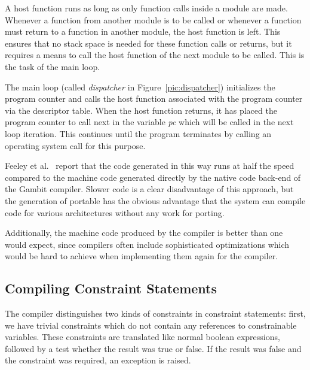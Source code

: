 A host function runs as long as only function calls inside a module
are made.  Whenever a function from another module is to be called or
whenever a function must return to a function in another module, the
host function is left.  This ensures that no stack space is needed for
these function calls or returns, but it requires a means to call the
host function of the next \turtle{} module to be called.  This is the
task of the main loop.

The main loop (called {\em dispatcher} in Figure~\ref{pic:dispatcher})
initializes the program counter and calls the host function associated
with the program counter via the descriptor table.  When the host
function returns, it has placed the program counter to call next in
the variable {\em pc} which will be called in the next loop iteration.
This continues until the program terminates by calling an operating
system call for this purpose.

Feeley et al.~\cite{feeley97compilingtoc} report that the \cee{} code
generated in this way runs at half the speed compared to the machine
code generated directly by the native code back-end of the Gambit
compiler.  Slower code is a clear disadvantage of this approach, but
the generation of portable \cee{} has the obvious advantage that the
\turtle{} system can compile code for various architectures without
any work for porting.

Additionally, the machine code produced by the \cee{} compiler is
better than one would expect, since \cee{} compilers often include
sophisticated optimizations which would be hard to achieve when
implementing them again for the \turtle{} compiler.


\subsection{Compiling Constraint Statements}
\label{sec:compiling-constraints}

The compiler distinguishes two kinds of constraints in constraint
statements: first, we have trivial constraints which do not contain
any references to constrainable variables.  These constraints are
translated like normal boolean expressions, followed by a test whether
the result was true or false.  If the result was false and the
constraint was required, an exception is raised.

